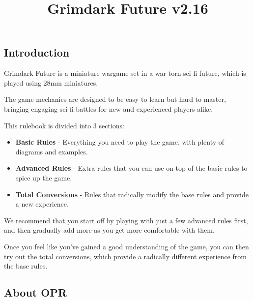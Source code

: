 \documentclass[9pt, a4paper, bookmarks=false]{extarticle}            %
\date{}                            %
\title{\Huge Grimdark Future \normalsize v2.16\vspace{-7em}}
\begin{document}

\raggedright                    %

\newpage


\maketitle

\begin{multicols}{2}

\subsection{Introduction}

Grimdark Future is a miniature wargame set in a war-torn sci-fi future, which is played using 28mm miniatures.

The game mechanics are designed to be easy to learn but hard to master, bringing engaging sci-fi battles for new and experienced players alike.

This rulebook is divided into 3 sections:

\begin{itemize}
  \item \textbf{Basic Rules} - Everything you need to play the game, with plenty of diagrams and examples.
  \item \textbf{Advanced Rules} - Extra rules that you can use on top of the basic rules to spice up the game.
  \item \textbf{Total Conversions} - Rules that radically modify the base rules and provide a new experience.
\end{itemize}

We recommend that you start off by playing with just a few advanced rules first, and then gradually add more as you get more comfortable with them.

Once you feel like you’ve gained a good understanding of the game, you can then try out the total conversions, which provide a radically different experience from the base rules.

\subsection{About OPR}


\end{multicols}
\end{document}
